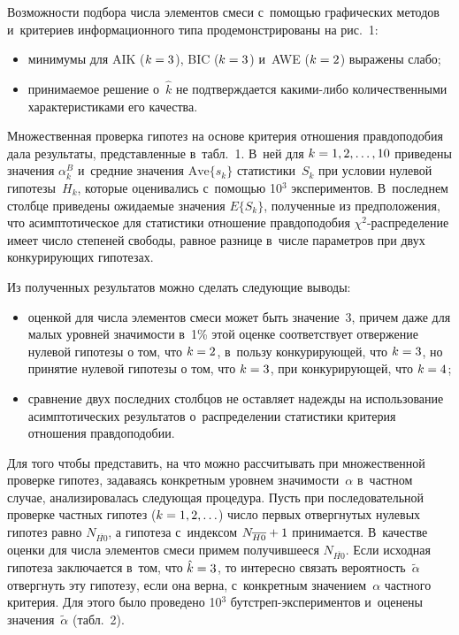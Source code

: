 \begin{multicols}{2}
     Возможности подбора числа элементов смеси с~помощью графических
методов и~критериев информационного типа продемонстрированы на рис.~1:
     \begin{itemize}
     \item
минимумы для AIK ($k\hm=3$), BIC ($k\hm=3$) и~AWE ($k\hm=2$)
выражены слабо;
     \item
принимаемое решение о~$\hat{k}$ не подтверждается ка\-ки\-ми-ли\-бо
количественными характеристиками его качества.
\end{itemize}

     Множественная проверка гипотез на основе критерия отношения
правдоподобия дала результаты, представленные в~табл.~1. В~ней для $k\hm=
1,2,\ldots,10$ приведены значения $\alpha_k^B$ и~средние значения
$\mathrm{Ave}\{s_k\}$ статистики~$S_k$ при условии нулевой
 гипотезы~$H_k$,
которые оценивались с~помощью 10$^3$ экспериментов. В~последнем столбце
приведены ожидаемые значения $E\{S_k\}$, полученные из предположения,
что асимптотическое для статистики отношение правдоподобия
     $\chi^2$-рас\-пре\-де\-ле\-ние имеет число степеней свободы, равное
разнице в~числе параметров при двух конкурирующих гипотезах.



     Из полученных результатов можно сделать следующие выводы:
     \begin{itemize}
\item оценкой для числа элементов смеси может быть значение~3, причем даже
для малых уровней значимости в~1\% этой оценке соответствует отвержение
нулевой гипотезы о том, что $k\hm=2$, в~пользу конкурирующей, что
$k\hm=3$, но принятие нулевой гипотезы о том, что $k\hm=3$, при
конкурирующей, что $k\hm=4$;
\item сравнение двух последних столбцов не оставляет надежды на
использование асимптотических результатов о~распределении статистики
критерия отношения правдоподобии.
\end{itemize}



     Для того чтобы представить, на что можно рассчитывать при
множественной проверке гипотез, задаваясь конкретным уровнем
значимости~$\alpha$ в~частном случае, анализировалась следующая процедура.
Пусть при последовательной проверке частных гипотез ($k\hm= 1,2,\ldots$)
число первых отвергнутых нулевых гипотез равно $N_{\overline{H0}}$, а
гипотеза с~индексом $N_{\overline{H0}}\hm+1$ принимается. В~качестве
оценки для числа элементов смеси примем получившееся $N_{\overline{H0}}$.
Если исходная гипотеза заключается в~том,
что $\hat{k}\hm=3$, то интересно
связать вероятность~$\tilde{\alpha}$ отвергнуть эту гипотезу, если она верна, с~конкретным значением~$\alpha$ частного критерия. Для этого было проведено
10$^3$ бут\-стреп-экс\-пе\-ри\-мен\-тов и~оценены значения~$\tilde{\alpha}$
(табл.~2).



\end{multicols}

